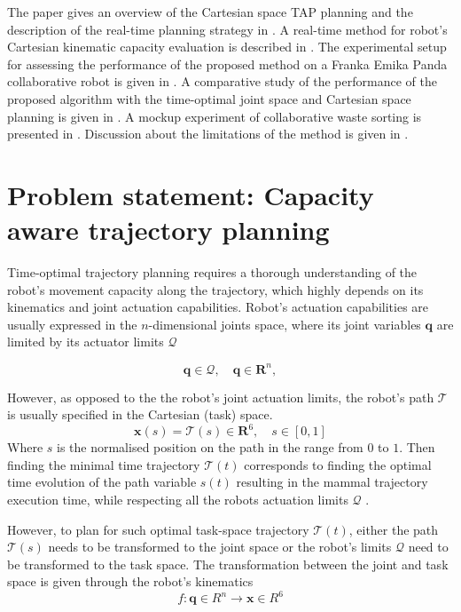 
The paper gives an overview of the Cartesian space TAP planning and the description of the real-time planning strategy in . A real-time method for robot's Cartesian kinematic capacity evaluation is described in . The experimental setup for assessing the performance of the proposed method on a Franka Emika Panda collaborative robot is given in . A comparative study of the performance of the proposed algorithm with the time-optimal joint space and Cartesian space planning is given in . A mockup experiment of collaborative waste sorting is presented in . Discussion about the limitations of the method is given in .


\section{Problem statement: Capacity aware trajectory planning }\label{ch:problem_statement}

Time-optimal trajectory planning requires a thorough understanding of the robot's movement capacity along the trajectory, which highly depends on its kinematics and joint actuation capabilities. Robot's actuation capabilities are usually expressed in the $n$-dimensional joints space, where its joint variables $\bm{q}$ are limited by its actuator limits $\mathcal{Q}$

\begin{equation}
\bm{q} \in \mathcal{Q}, \quad \bm{q}\in \bm{R}^n,
\end{equation}

However, as opposed to the the robot's joint actuation limits, the robot's path $\mathcal{T}$ is usually specified in the Cartesian (task) space.
\begin{equation}
\bm{x}(s) = \mathcal{T}(s) \in \bm{R}^6,\quad s\in\left[0,1\right]
\end{equation}
Where $s$ is the normalised position on the path in the range from $0$ to $1$. Then finding the minimal time trajectory $\mathcal{T}(t)$ corresponds to finding the optimal time evolution of the path variable $s(t)$ resulting in the mammal trajectory execution time, while respecting all the robots actuation limits $\mathcal{Q}$ \cite{modernrobotics}. 

However, to plan for such optimal task-space trajectory $\mathcal{T}(t)$, either the path $\mathcal{T}(s)$ needs to be transformed to the joint space or the robot's limits $\mathcal{Q}$ need to be transformed to the task space.
The transformation between the joint and task space is given through the robot's kinematics
\begin{equation}
f : \bm{q} \in R^n \to \bm{x}\in  R^6
\end{equation}

